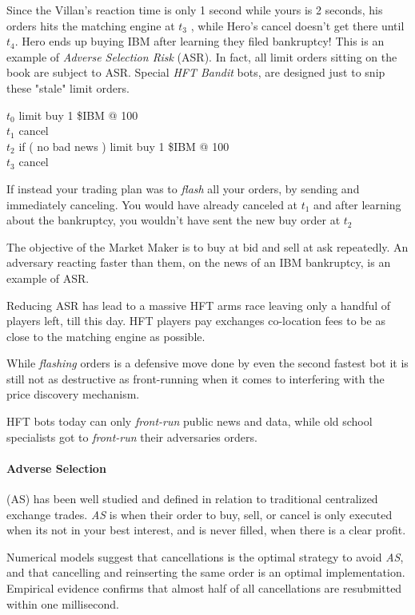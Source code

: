 \documentclass[12pt]{article}
\begin{document}
Since the Villan's reaction time is only 1 second while yours is 2 seconds, his orders hits the matching engine at $t_3$ , while Hero's cancel doesn't get there until $t_4$. Hero ends up buying IBM after learning they filed bankruptcy! This is an example of \emph{Adverse Selection Risk} (ASR). In fact, all limit orders sitting on the book are subject to ASR. Special \emph{HFT Bandit} bots, are designed just to snip these "stale" limit orders. 

$t_0$ limit buy 1 \$IBM @ 100 \\
$t_1$ cancel \\
$t_2$ if ( no bad news ) limit buy 1 \$IBM @ 100 \\
$t_3$ cancel 

If instead your trading plan was to \emph{flash} all your orders, by sending and immediately canceling. You would have already canceled at $t_1$ and after learning about the bankruptcy, you wouldn't have sent the new buy order at $t_2$

The objective of the Market Maker is to buy at bid and sell at ask repeatedly. An adversary reacting faster than them, on the news of an IBM bankruptcy, is an example of ASR. 

Reducing ASR has lead to a massive HFT arms race leaving only a handful of players left, till this day. HFT players pay exchanges co-location fees to be as close to the matching engine as possible. 

While \emph{flashing} orders is a defensive move done by even the second fastest bot it is still not as destructive as front-running when it comes to interfering with the price discovery mechanism. 

HFT bots today can only \emph{front-run} public news and data, while old school specialists got to \emph{front-run} their adversaries orders. 

\paragraph{Adverse Selection} (AS) has been well studied and defined in relation to traditional centralized exchange trades. \emph{AS} is when their order to buy, sell, or cancel is only executed when its not in your best interest, and is never filled, when there is a clear profit. 

Numerical models suggest that cancellations is the optimal strategy to avoid \emph{AS}, and that cancelling and reinserting the same order is an optimal implementation. \cite{Lehalle}  Empirical evidence confirms that almost half of all cancellations are resubmitted within one millisecond. \cite{Menkveld2} 
\end{document}

